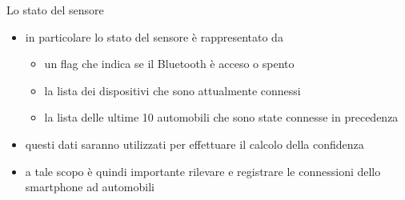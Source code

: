 \documentclass{beamer}
\begin{document}
\begin{frame}{Lo stato del sensore}
{\begin{itemize}
\item in particolare lo stato del sensore è rappresentato da
    \begin{itemize}
        \item un flag che indica se il Bluetooth è acceso o spento
        \item la lista dei dispositivi che sono attualmente connessi
        \item la lista delle ultime 10 automobili che sono state connesse in precedenza
    \end{itemize}
\item questi dati saranno utilizzati per effettuare il calcolo della confidenza
\item a tale scopo è quindi importante rilevare e registrare le connessioni dello smartphone ad automobili
\end{itemize}
}
\end{frame}
\end{document}

